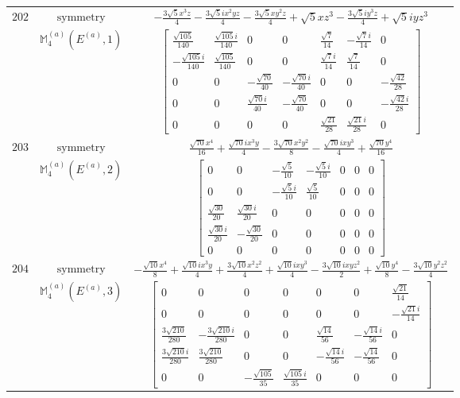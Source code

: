 \documentclass[fleqn,8pt,landscape]{jsarticle}
\begin{document}
\begin{longtable}{ccc}
$ 202 $ & $ \text{symmetry} $ & $ - \frac{3 \sqrt{5} x^{3} z}{4} - \frac{3 \sqrt{5} i x^{2} y z}{4} - \frac{3 \sqrt{5} x y^{2} z}{4} + \sqrt{5} x z^{3} - \frac{3 \sqrt{5} i y^{3} z}{4} + \sqrt{5} i y z^{3} $ \\
$  $ & $ \mathbb{M}_{4}^{(a)}(E^{(a)},1) $ & $ \begin{bmatrix} \frac{\sqrt{105}}{140} & \frac{\sqrt{105} i}{140} & 0 & 0 & \frac{\sqrt{7}}{14} & - \frac{\sqrt{7} i}{14} & 0 \\ - \frac{\sqrt{105} i}{140} & \frac{\sqrt{105}}{140} & 0 & 0 & \frac{\sqrt{7} i}{14} & \frac{\sqrt{7}}{14} & 0 \\ 0 & 0 & - \frac{\sqrt{70}}{40} & - \frac{\sqrt{70} i}{40} & 0 & 0 & - \frac{\sqrt{42}}{28} \\ 0 & 0 & \frac{\sqrt{70} i}{40} & - \frac{\sqrt{70}}{40} & 0 & 0 & - \frac{\sqrt{42} i}{28} \\ 0 & 0 & 0 & 0 & \frac{\sqrt{21}}{28} & \frac{\sqrt{21} i}{28} & 0 \end{bmatrix} $ \\ \hline
$ 203 $ & $ \text{symmetry} $ & $ \frac{\sqrt{70} x^{4}}{16} + \frac{\sqrt{70} i x^{3} y}{4} - \frac{3 \sqrt{70} x^{2} y^{2}}{8} - \frac{\sqrt{70} i x y^{3}}{4} + \frac{\sqrt{70} y^{4}}{16} $ \\
$  $ & $ \mathbb{M}_{4}^{(a)}(E^{(a)},2) $ & $ \begin{bmatrix} 0 & 0 & - \frac{\sqrt{5}}{10} & - \frac{\sqrt{5} i}{10} & 0 & 0 & 0 \\ 0 & 0 & - \frac{\sqrt{5} i}{10} & \frac{\sqrt{5}}{10} & 0 & 0 & 0 \\ \frac{\sqrt{30}}{20} & \frac{\sqrt{30} i}{20} & 0 & 0 & 0 & 0 & 0 \\ \frac{\sqrt{30} i}{20} & - \frac{\sqrt{30}}{20} & 0 & 0 & 0 & 0 & 0 \\ 0 & 0 & 0 & 0 & 0 & 0 & 0 \end{bmatrix} $ \\ \hline
$ 204 $ & $ \text{symmetry} $ & $ - \frac{\sqrt{10} x^{4}}{8} + \frac{\sqrt{10} i x^{3} y}{4} + \frac{3 \sqrt{10} x^{2} z^{2}}{4} + \frac{\sqrt{10} i x y^{3}}{4} - \frac{3 \sqrt{10} i x y z^{2}}{2} + \frac{\sqrt{10} y^{4}}{8} - \frac{3 \sqrt{10} y^{2} z^{2}}{4} $ \\
$  $ & $ \mathbb{M}_{4}^{(a)}(E^{(a)},3) $ & $ \begin{bmatrix} 0 & 0 & 0 & 0 & 0 & 0 & \frac{\sqrt{21}}{14} \\ 0 & 0 & 0 & 0 & 0 & 0 & - \frac{\sqrt{21} i}{14} \\ \frac{3 \sqrt{210}}{280} & - \frac{3 \sqrt{210} i}{280} & 0 & 0 & \frac{\sqrt{14}}{56} & - \frac{\sqrt{14} i}{56} & 0 \\ \frac{3 \sqrt{210} i}{280} & \frac{3 \sqrt{210}}{280} & 0 & 0 & - \frac{\sqrt{14} i}{56} & - \frac{\sqrt{14}}{56} & 0 \\ 0 & 0 & - \frac{\sqrt{105}}{35} & \frac{\sqrt{105} i}{35} & 0 & 0 & 0 \end{bmatrix} $ \\ \hline

\end{longtable}
\end{document}
